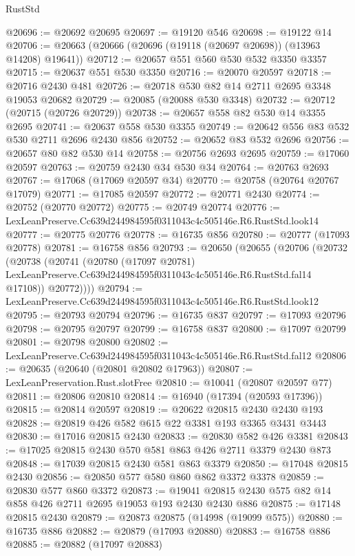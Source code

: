 \begin{lexlean}{RustStd}
\begin{coremodule}
@20696 := @20692 @20695
@20697 := @19120 @546
@20698 := @19122 @14
@20706 := @20663 (@20666 (@20696 (@19118 (@20697 @20698)) (@13963 @14208) @19641))
@20712 := @20657 @551 @560 @530 @532 @3350 @3357
@20715 := @20637 @551 @530 @3350
@20716 := @20070 @20597
@20718 := @20716 @2430 @481
@20726 := @20718 @530 @82 @14 @2711 @2695 @3348 @19053 @20682
@20729 := @20085 (@20088 @530 @3348)
@20732 := @20712 (@20715 (@20726 @20729))
@20738 := @20657 @558 @82 @530 @14 @3355 @2695
@20741 := @20637 @558 @530 @3355
@20749 := @20642 @556 @83 @532 @530 @2711 @2696 @2430 @856
@20752 := @20652 @83 @532 @2696
@20756 := @20657 @80 @82 @530 @14
@20758 := @20756 @2693 @2695
@20759 := @17060 @20597
@20763 := @20759 @2430 @34 @530 @34
@20764 := @20763 @2693
@20767 := @17068 (@17069 @20597 @34)
@20770 := @20758 (@20764 @20767 @17079)
@20771 := @17085 @20597
@20772 := @20771 @2430
@20774 := @20752 (@20770 @20772)
@20775 := @20749 @20774
@20776 := LexLeanPreserve.Cc639d244984595f0311043c4c505146e.R6.RustStd.look14
@20777 := @20775 @20776
@20778 := @16735 @856
@20780 := @20777 (@17093 @20778)
@20781 := @16758 @856
@20793 := @20650
    (@20655
      (@20706
        (@20732
          (@20738
            (@20741
              (@20780
                (@17097 @20781)
                LexLeanPreserve.Cc639d244984595f0311043c4c505146e.R6.RustStd.fal14
                @17108))
            @20772))))
@20794 := LexLeanPreserve.Cc639d244984595f0311043c4c505146e.R6.RustStd.look12
@20795 := @20793 @20794
@20796 := @16735 @837
@20797 := @17093 @20796
@20798 := @20795 @20797
@20799 := @16758 @837
@20800 := @17097 @20799
@20801 := @20798 @20800
@20802 := LexLeanPreserve.Cc639d244984595f0311043c4c505146e.R6.RustStd.fal12
@20806 := @20635 (@20640 (@20801 @20802 @17963))
@20807 := LexLeanPreservation.Rust.slotFree
@20810 := @10041 (@20807 @20597 @77)
@20811 := @20806 @20810
@20814 := @16940 (@17394 (@20593 @17396))
@20815 := @20814 @20597
@20819 := @20622 @20815 @2430 @2430 @193
@20828 := @20819 @426 @582 @615 @22 @3381 @193 @3365 @3431 @3443
@20830 := @17016 @20815 @2430
@20833 := @20830 @582 @426 @3381
@20843 := @17025 @20815 @2430 @570 @581 @863 @426 @2711 @3379 @2430 @873
@20848 := @17039 @20815 @2430 @581 @863 @3379
@20850 := @17048 @20815 @2430
@20856 := @20850 @577 @580 @860 @862 @3372 @3378
@20859 := @20830 @577 @860 @3372
@20873 := @19041 @20815 @2430 @575 @82 @14 @858 @426 @2711 @2695 @19053 @193 @2430 @2430 @886
@20875 := @17148 @20815 @2430
@20879 := @20873 @20875 (@14998 (@19099 @575))
@20880 := @16735 @886
@20882 := @20879 (@17093 @20880)
@20883 := @16758 @886
@20885 := @20882 (@17097 @20883)

\end{coremodule}
\end{lexlean}
